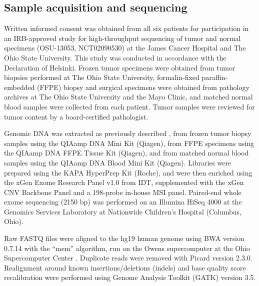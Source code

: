 \subsection{Sample acquisition and sequencing}
\label{ssec:msiclones:sampleseq}
Written informed consent was obtained from all six patients for participation in an IRB-approved study for high-throughput sequencing of tumor and normal specimens (OSU-13053, NCT02090530) at the James Cancer Hospital and The Ohio State University. This study was conducted in accordance with the Declaration of Helsinki. Frozen tumor specimens were obtained from tumor biopsies performed at The Ohio State University, formalin-fixed paraffin-embedded (FFPE) biopsy and surgical specimens were obtained from pathology archives at The Ohio State University and the Mayo Clinic, and matched normal blood samples were collected from each patient. Tumor samples were reviewed for tumor content by a board-certified pathologist.

Genomic DNA was extracted as previously described \cite{chen2019}, from frozen tumor biopsy samples using the \mbox{QIAamp} DNA Mini Kit (Qiagen), from FFPE specimens using the \mbox{QIAamp} DNA FFPE Tissue Kit (Qiagen), and from matched normal blood samples using the \mbox{QIAamp} DNA Blood Mini Kit (Qiagen). Libraries were prepared using the KAPA HyperPrep Kit (Roche), and were then enriched using the xGen Exome Research Panel v1.0 from IDT, supplemented with the xGen CNV Backbone Panel and a 198-probe in-house MSI panel. Paired-end whole exome sequencing (2\texttimes{}150 bp) was performed on an Illumina HiSeq 4000 at the Genomics Services Laboratory at Nationwide Children's Hospital (Columbus, Ohio).

Raw FASTQ files were aligned to the hg19 human genome \cite{lander2001} using BWA version 0.7.14 \cite{bwa} with the ``mem'' algorithm, run on the Owens supercomputer at the Ohio Supercomputer Center \cite{Owens2016}. Duplicate reads were removed with Picard \cite{Picard2019toolkit} version 2.3.0. Realignment around known insertions\slash{}deletions (indels) and base quality score recalibration were performed using Genome Analysis Toolkit (GATK) \cite{mckenna10} version 3.5.

